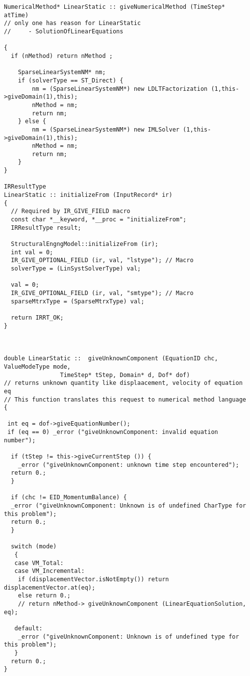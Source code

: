 \documentclass[12pt,draft]{article}
\begin{document}
{\small\begin{verbatim}
NumericalMethod* LinearStatic :: giveNumericalMethod (TimeStep* atTime)
// only one has reason for LinearStatic 
//     - SolutionOfLinearEquations

{
  if (nMethod) return nMethod ;
	
	SparseLinearSystemNM* nm;
	if (solverType == ST_Direct) {
		nm = (SparseLinearSystemNM*) new LDLTFactorization (1,this->giveDomain(1),this);
		nMethod = nm;
		return nm;
	} else {
		nm = (SparseLinearSystemNM*) new IMLSolver (1,this->giveDomain(1),this);
		nMethod = nm;
		return nm;
	}
}

IRResultType
LinearStatic :: initializeFrom (InputRecord* ir)
{
  // Required by IR_GIVE_FIELD macro
  const char *__keyword, *__proc = "initializeFrom"; 
  IRResultType result;                              

  StructuralEngngModel::initializeFrom (ir);
  int val = 0;
  IR_GIVE_OPTIONAL_FIELD (ir, val, "lstype"); // Macro
  solverType = (LinSystSolverType) val;

  val = 0;
  IR_GIVE_OPTIONAL_FIELD (ir, val, "smtype"); // Macro
  sparseMtrxType = (SparseMtrxType) val;

  return IRRT_OK;
}
 


double LinearStatic ::  giveUnknownComponent (EquationID chc, ValueModeType mode, 
                TimeStep* tStep, Domain* d, Dof* dof)
// returns unknown quantity like displaacement, velocity of equation eq
// This function translates this request to numerical method language
{
 
 int eq = dof->giveEquationNumber();
 if (eq == 0) _error ("giveUnknownComponent: invalid equation number");

  if (tStep != this->giveCurrentStep ()) {
    _error ("giveUnknownComponent: unknown time step encountered");
  return 0.;
  }

  if (chc != EID_MomentumBalance) {
  _error ("giveUnknownComponent: Unknown is of undefined CharType for this problem");
  return 0.;
  }

  switch (mode)
   {
   case VM_Total:
   case VM_Incremental:
    if (displacementVector.isNotEmpty()) return displacementVector.at(eq);
    else return 0.;
    // return nMethod-> giveUnknownComponent (LinearEquationSolution, eq);

   default:
    _error ("giveUnknownComponent: Unknown is of undefined type for this problem");
   }
  return 0.;
}  



\end{verbatim}}
\end{document}
